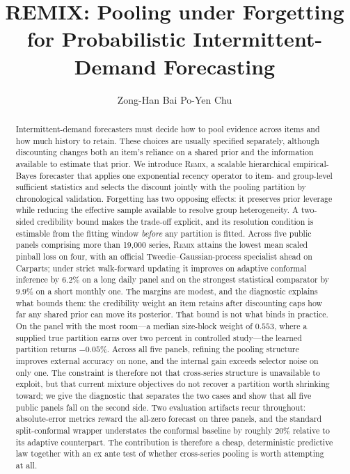 \documentclass[twocolumn,10pt]{article}
\title{REMIX: Pooling under Forgetting for Probabilistic
Intermittent-Demand Forecasting}
\author{Zong-Han Bai \qquad Po-Yen Chu}
\date{}
\theoremstyle{definition}
\newcommand{\REMIX}{\textsc{Remix}}
\begin{document}
\maketitle



\begin{abstract}
Intermittent-demand forecasters must decide how to pool evidence across
items and how much history to retain. These choices are usually specified
separately, although discounting changes both an item's reliance on a
shared prior and the information available to estimate that prior. We
introduce \REMIX{}, a scalable hierarchical empirical-Bayes forecaster
that applies one exponential recency operator to item- and group-level
sufficient statistics and selects the discount jointly with the pooling
partition by chronological validation. Forgetting has two opposing
effects: it preserves prior leverage while reducing the effective sample
available to resolve group heterogeneity. A two-sided credibility bound
makes the trade-off explicit, and its resolution condition is estimable
from the fitting window \emph{before} any partition is fitted. Across five
public panels comprising more than 19{,}000 series, \REMIX{} attains the
lowest mean scaled pinball loss on four, with an official
Tweedie--Gaussian-process specialist ahead on Carparts; under strict
walk-forward updating it improves on adaptive conformal inference by
$6.2\%$ on a long daily panel and on the strongest statistical comparator
by $9.9\%$ on a short monthly one. The margins are modest, and the
diagnostic explains what bounds them: the credibility weight an item
retains after discounting caps how far any shared prior can move its
posterior. That bound is not what binds in practice. On the panel with the
most room---a median size-block weight of $0.553$, where a supplied true
partition earns over two percent in controlled study---the learned
partition returns $-0.05\%$. Across all five panels, refining the pooling
structure improves external accuracy on none, and the internal gain
exceeds selector noise on only one. The constraint is therefore not that
cross-series structure is unavailable to exploit, but that current mixture
objectives do not recover a partition worth shrinking toward; we give the
diagnostic that separates the two cases and show that all five public
panels fall on the second side. Two evaluation artifacts recur throughout: absolute-error
metrics reward the all-zero forecast on three panels, and the standard
split-conformal wrapper understates the conformal baseline by roughly
$20\%$ relative to its adaptive counterpart. The contribution is therefore
a cheap, deterministic predictive law together with an ex ante test of
whether cross-series pooling is worth attempting at all.
\end{abstract}
\end{document}
